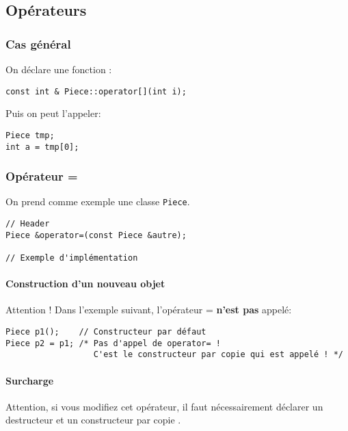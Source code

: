 \documentclass[10pt,a4paper,french]{article}
\begin{document}
\subsection{Opérateurs}

\subsubsection{Cas général}

On déclare une fonction :

\begin{verbatim}
const int & Piece::operator[](int i);
\end{verbatim}

Puis on peut l'appeler:

\begin{verbatim}
Piece tmp;
int a = tmp[0];
\end{verbatim}

\subsubsection{Opérateur =\label{operator-equals}}

On prend comme exemple une classe {\tt Piece}.

\begin{verbatim}
// Header
Piece &operator=(const Piece &autre);

// Exemple d'implémentation

\end{verbatim}

\paragraph{Construction d'un nouveau objet}

Attention ! Dans l'exemple suivant, l'opérateur = \textbf{n'est pas} appelé:
\begin{verbatim}
Piece p1();    // Constructeur par défaut
Piece p2 = p1; /* Pas d'appel de operator= !
                  C'est le constructeur par copie qui est appelé ! */
\end{verbatim}

\paragraph{Surcharge}
Attention, si vous modifiez cet opérateur, il faut nécessairement déclarer un destructeur  et un constructeur par copie .
\end{document}
